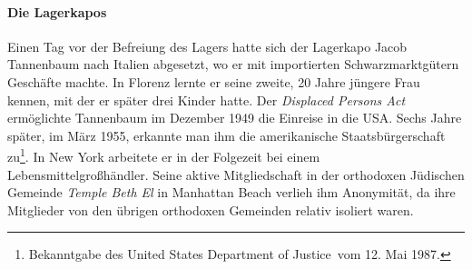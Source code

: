 \paragraph{Die Lagerkapos\label{kapos_ahndung}}
Einen Tag vor der Befreiung des Lagers hatte sich der Lagerkapo Jacob Tannenbaum nach Italien abgesetzt, wo er mit importierten Schwarzmarktgütern Geschäfte machte. In Florenz lernte er seine zweite, 20 Jahre jüngere Frau kennen, mit der er später drei Kinder hatte. Der \emph{Displaced Persons Act} ermöglichte Tannenbaum im Dezember 1949 die Einreise in die USA. Sechs Jahre später, im März 1955, erkannte man ihm die amerikanische Staatsbürgerschaft zu\footnote{Bekanntgabe des \glqq United States Department of Justice\grqq~vom 12. Mai 1987.}. 
In New York arbeitete er in der Folgezeit bei einem Lebensmittelgroßhändler. Seine aktive Mitgliedschaft in der orthodoxen Jüdischen Gemeinde \emph{Temple Beth El} in Manhattan Beach verlieh ihm Anonymität, da ihre Mitglieder von den übrigen orthodoxen Gemeinden relativ isoliert waren.\newline

